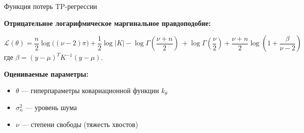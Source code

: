 \documentclass{beamer}
\begin{document}
\begin{frame}{Функция потерь TP-регрессии}

{
\textbf{Отрицательное логарифмическое маргинальное правдоподобие:}

\footnotesize{
\[
\mathcal{L}(\theta) = \frac{n}{2}\log\!\bigl((\nu-2)\pi\bigr)
+ \frac{1}{2}\log|K|
- \log\Gamma\!\left(\frac{\nu+n}{2}\right)\
+ \log\Gamma\!\left(\frac{\nu}{2}\right)
+ \frac{\nu+n}{2}\log\!\left(1+\frac{\beta}{\nu-2}\right)
\]
}
где $\beta = (y-\mu)^T K^{-1}(y-\mu)$.

\vspace{5pt}

\textbf{Оцениваемые параметры:}
\begin{itemize}
    \item $\theta$ --- гиперпараметры ковариационной функции $k_\theta$
    \item $\sigma_n^2$ --- уровень шума
    \item $\nu$ --- степени свободы (тяжесть хвостов)
\end{itemize}

\vspace{5pt}

}

\end{frame}

\end{document}
